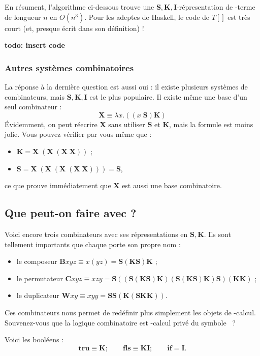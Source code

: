 En résument, l'algorithme ci-dessous trouve une $\mathbf{S, K, I}$-répresentation de \lam -terme de longueur $n$ en $O(n^3)$. Pour les adeptes de Haskell, le code de $T[]$ est très court (et, presque écrit dans son définition) !

\textbf{todo: insert code}

\subsubsection*{Autres systèmes combinatoires}

La réponse à la dernière question est aussi oui : il existe plusieurs systèmes de combinateurs, mais $\mathbf{S, K, I}$ est le plus populaire. Il existe même une base d'un seul combinateur :
\[\mathbf{X} \equiv \lambda x. ((x \; \mathbf{S}) \mathbf{K})\]
Évidemment, on peut réecrire $\mathbf{X}$ sans utiliser $\mathbf{S}$ et $\mathbf{K}$, mais la formule est moins jolie. Vous pouvez vérifier par vous même que :
\begin{itemize}
	\item $\mathbf{K = X \; (X \; (X \; X))}$ ;
	\item $\mathbf{S = X \; (X \; (X \; (X \; X))) = S}$,
\end{itemize}
ce que prouve immédiatement que $\mathbf{X}$ est aussi une base combinatoire.

\subsection*{Que peut-on faire avec ?}

Voici encore trois combinateurs avec ses répresentations en $\mathbf{S, K}$. Ils sont tellement importants que chaque porte son propre nom :
\begin{itemize}
	\item le composeur $\mathbf{B} xyz \equiv x(yz) = \mathbf{S(KS)K}$ ;
	\item le permutateur $\mathbf{C} xyz \equiv xzy = \mathbf{S ((S(KS)K) (S(KS)K) S) (KK)}$ ;
	\item le duplicateur $\mathbf{W} xy \equiv xyy = \mathbf{SS(K(SKK))}$.
\end{itemize}

Ces combinateurs nous permet de redéfinir plus simplement les objets de \lam -calcul. Souvenez-vous que la logique combinatoire est \lam -calcul privé du symbole \lam ~?

Voici les booléens :
\[\mathbf{tru} \equiv \mathbf{K} ; \qquad \mathbf{fls} \equiv \mathbf{KI} ; \qquad \mathbf{if} = \mathbf{I}.\]

